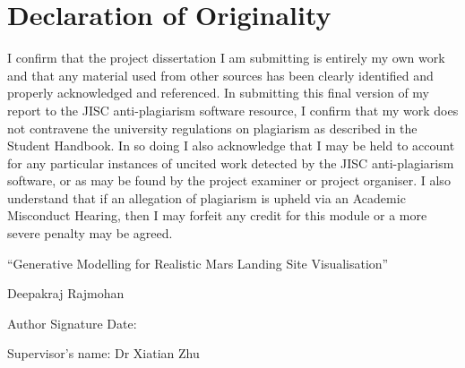 \chapter*{Declaration of Originality}
I confirm that the project dissertation I am submitting is entirely my own work and that any material used from other sources has been clearly identified and properly acknowledged and referenced. In submitting this final version of my report to the JISC anti-plagiarism software resource, I confirm that my work does not contravene the university regulations on plagiarism as described in the Student Handbook. In so doing I also acknowledge that I may be held to account for any particular instances of uncited work detected by the JISC anti-plagiarism software, or as may be found by the project examiner or project organiser. I also understand that if an allegation of plagiarism is upheld via an Academic Misconduct Hearing, then I may forfeit any credit for this module or a more severe penalty may be agreed.

\vspace{2em}
\noindent ``Generative Modelling for Realistic Mars Landing Site Visualisation''

\vspace{2em}
\noindent Deepakraj Rajmohan

\vspace{3em}
\noindent Author Signature \hfill Date:

\vspace{2em}
\noindent Supervisor's name: Dr Xiatian Zhu
